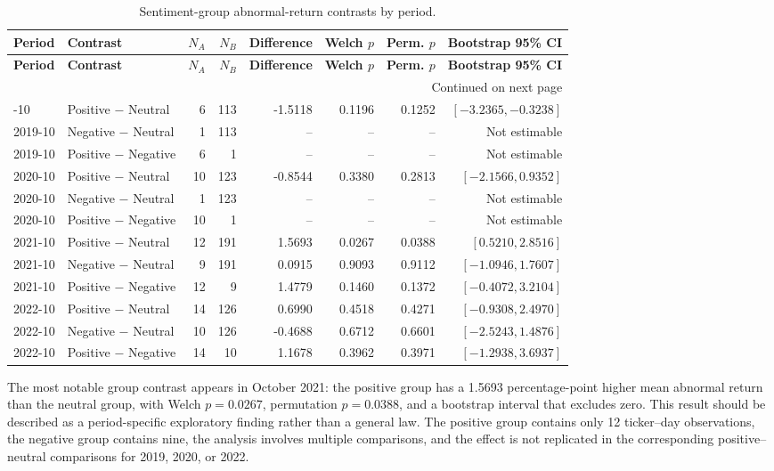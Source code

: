 \begin{longtable}{llrrrrrr}
\caption{Sentiment-group abnormal-return contrasts by period.}\label{tab:sentiment-contrasts-multi-year}\\
\toprule
\textbf{Period} & \textbf{Contrast} & \textbf{$N_A$} & \textbf{$N_B$} & \textbf{Difference} & \textbf{Welch $p$} & \textbf{Perm. $p$} & \textbf{Bootstrap 95\% CI} \\
\midrule
\endfirsthead
\toprule
\textbf{Period} & \textbf{Contrast} & \textbf{$N_A$} & \textbf{$N_B$} & \textbf{Difference} & \textbf{Welch $p$} & \textbf{Perm. $p$} & \textbf{Bootstrap 95\% CI} \\
\midrule
\endhead
\midrule
\multicolumn{8}{r}{Continued on next page}\\
\endfoot
\bottomrule
\endlastfoot
2019-10 & Positive $-$ Neutral & 6 & 113 & -1.5118 & 0.1196 & 0.1252 & $[-3.2365,-0.3238]$ \\
2019-10 & Negative $-$ Neutral & 1 & 113 & -- & -- & -- & Not estimable \\
2019-10 & Positive $-$ Negative & 6 & 1 & -- & -- & -- & Not estimable \\
2020-10 & Positive $-$ Neutral & 10 & 123 & -0.8544 & 0.3380 & 0.2813 & $[-2.1566,0.9352]$ \\
2020-10 & Negative $-$ Neutral & 1 & 123 & -- & -- & -- & Not estimable \\
2020-10 & Positive $-$ Negative & 10 & 1 & -- & -- & -- & Not estimable \\
2021-10 & Positive $-$ Neutral & 12 & 191 & 1.5693 & 0.0267 & 0.0388 & $[0.5210,2.8516]$ \\
2021-10 & Negative $-$ Neutral & 9 & 191 & 0.0915 & 0.9093 & 0.9112 & $[-1.0946,1.7607]$ \\
2021-10 & Positive $-$ Negative & 12 & 9 & 1.4779 & 0.1460 & 0.1372 & $[-0.4072,3.2104]$ \\
2022-10 & Positive $-$ Neutral & 14 & 126 & 0.6990 & 0.4518 & 0.4271 & $[-0.9308,2.4970]$ \\
2022-10 & Negative $-$ Neutral & 10 & 126 & -0.4688 & 0.6712 & 0.6601 & $[-2.5243,1.4876]$ \\
2022-10 & Positive $-$ Negative & 14 & 10 & 1.1678 & 0.3962 & 0.3971 & $[-1.2938,3.6937]$ \\
\end{longtable}

The most notable group contrast appears in October 2021: the positive group has a 1.5693 percentage-point higher mean abnormal return than the neutral group, with Welch $p=0.0267$, permutation $p=0.0388$, and a bootstrap interval that excludes zero. This result should be described as a period-specific exploratory finding rather than a general law. The positive group contains only 12 ticker--day observations, the negative group contains nine, the analysis involves multiple comparisons, and the effect is not replicated in the corresponding positive--neutral comparisons for 2019, 2020, or 2022.


